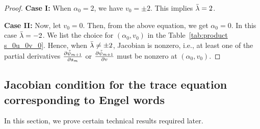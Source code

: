 \documentclass[10pt,twoside]{amsart}
\theoremstyle{definition}
\theoremstyle{definition}
\begin{document}
\begin{proof}
\textbf{Case I:} When $\alpha_0 = 2$, we have $v_0 = \pm 2$. This implies $\Bar{\lambda}=2$.

\textbf{Case II:} Now, let $v_0 = 0$. Then, from the above equation, we get $\alpha_0 = 0$. In this case $\Bar{\lambda} = -2$. We list the choice for $(\alpha_0, v_0)$ in the Table~\ref{tab:product s_0u_0v_0}. Hence, when $\Bar{\lambda} \neq \pm 2$, Jacobian is nonzero, i.e., at least one of the partial derivatives $\frac{\partial\Tilde{\psi}_{m+1}}{\partial s_m}$ or $ \frac{\partial\Tilde{\psi}_{m+1}}{\partial v}$ must be nonzero at $(\alpha_0, v_0)$.
\end{proof}



\subsection{Jacobian condition for the trace equation corresponding to Engel words}\label{sub-trace}
In this section, we prove certain technical results required later.
\end{document}
